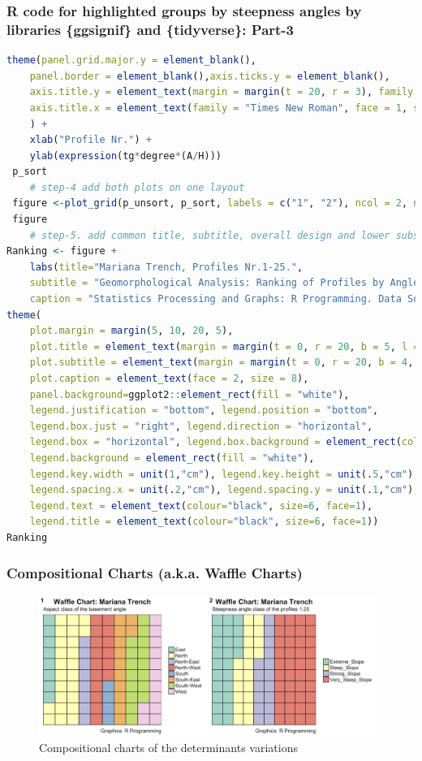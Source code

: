 \documentclass[pdflatex,compress,10pt,
	xcolor={dvipsnames,dvipsnames,svgnames,x11names,table},
	hyperref={colorlinks = true,breaklinks = true, urlcolor = NavyBlue, breaklinks = true}]{beamer}
\begin{document}
\begin{frame}[fragile,shrink=20]\frametitle{R code for highlighted groups by steepness angles by libraries \{ggsignif\} and \{tidyverse\}: Part-3}
\begin{lstlisting}[language=R]
    theme(panel.grid.major.y = element_blank(), 
	panel.border = element_blank(),axis.ticks.y = element_blank(),
	axis.title.y = element_text(margin = margin(t = 20, r = 3), family = "Times New Roman", face = 1, size = 10),
	axis.title.x = element_text(family = "Times New Roman", face = 1, size = 10, margin = margin(t = .2)),
	) +
	xlab("Profile Nr.") +
	ylab(expression(tg*degree*(A/H)))
 p_sort
	# step-4 add both plots on one layout
 figure <-plot_grid(p_unsort, p_sort, labels = c("1", "2"), ncol = 2, nrow = 1)
 figure
	# step-5. add common title, subtitle, overall design and lower subscript
Ranking <- figure +						
	labs(title="Mariana Trench, Profiles Nr.1-25.", 
	subtitle = "Geomorphological Analysis: Ranking of Profiles by Angle Steepness (Left: Unsorted; Right: Sorted and Grouped)",
	caption = "Statistics Processing and Graphs: R Programming. Data Source: QGIS") +
theme(
	plot.margin = margin(5, 10, 20, 5),
	plot.title = element_text(margin = margin(t = 0, r = 20, b = 5, l = 0), family = "Kai", face = "bold", size = 12), 
	plot.subtitle = element_text(margin = margin(t = 0, r = 20, b = 4, l = 0), family = "Hei", face = "bold", size = 10), 
	plot.caption = element_text(face = 2, size = 8),
	panel.background=ggplot2::element_rect(fill = "white"),
	legend.justification = "bottom", legend.position = "bottom",
	legend.box.just = "right", legend.direction = "horizontal",
	legend.box = "horizontal", legend.box.background = element_rect(colour = "honeydew4",size=0.2),
	legend.background = element_rect(fill = "white"),
	legend.key.width = unit(1,"cm"), legend.key.height = unit(.5,"cm"),
	legend.spacing.x = unit(.2,"cm"), legend.spacing.y = unit(.1,"cm"),
	legend.text = element_text(colour="black", size=6, face=1),
	legend.title = element_text(colour="black", size=6, face=1))
Ranking
\end{lstlisting}
\end{frame}

\begin{frame}\frametitle{Compositional Charts (a.k.a. Waffle Charts)}
\begin{figure}[H]
	\centering
		\includegraphics[width=11cm]{Fig-3-10.jpg}
	\caption{Compositional charts of the determinants variations}
\end{figure}		
\end{frame}
\end{document}

